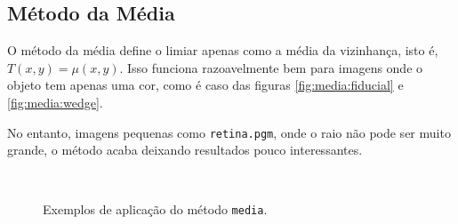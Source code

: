 \subsection{Método da Média}

O método da média define o limiar apenas como a média da vizinhança, isto é, $T(x, y) = \mu(x, y)$. Isso funciona razoavelmente bem para imagens onde o objeto tem apenas uma cor, como é caso das figuras \ref{fig:media:fiducial} e \ref{fig:media:wedge}.

No entanto, imagens pequenas como \texttt{retina.pgm}, onde o raio não pode ser muito grande, o método acaba deixando resultados pouco interessantes.

\begin{figure}[H]
    \centering
    \\[8pt]

    \caption{Exemplos de aplicação do método \texttt{media}.}
    \label{fig:media}
\end{figure}
